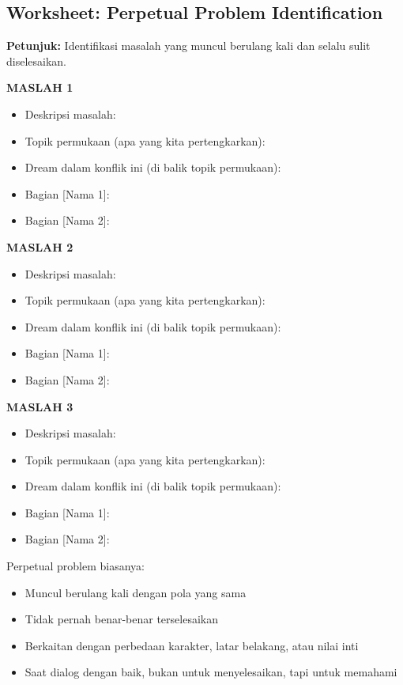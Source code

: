 \subsection{Worksheet: Perpetual Problem Identification}

\begin{exercisebox}
\textbf{Petunjuk:} Identifikasi masalah yang muncul berulang kali dan selalu sulit diselesaikan.

\vspace{0.3cm}
\textbf{MASLAH 1}
\begin{itemize}[itemsep=0.15cm]
    \item Deskripsi masalah: \hrulefill
    \item Topik permukaan (apa yang kita pertengkarkan): \hrulefill
    \item Dream dalam konflik ini (di balik topik permukaan): \hrulefill
    \item Bagian [Nama 1]: \hrulefill
    \item Bagian [Nama 2]: \hrulefill
\end{itemize}

\textbf{MASLAH 2}
\begin{itemize}[itemsep=0.15cm]
    \item Deskripsi masalah: \hrulefill
    \item Topik permukaan (apa yang kita pertengkarkan): \hrulefill
    \item Dream dalam konflik ini (di balik topik permukaan): \hrulefill
    \item Bagian [Nama 1]: \hrulefill
    \item Bagian [Nama 2]: \hrulefill
\end{itemize}

\textbf{MASLAH 3}
\begin{itemize}[itemsep=0.15cm]
    \item Deskripsi masalah: \hrulefill
    \item Topik permukaan (apa yang kita pertengkarkan): \hrulefill
    \item Dream dalam konflik ini (di balik topik permukaan): \hrulefill
    \item Bagian [Nama 1]: \hrulefill
    \item Bagian [Nama 2]: \hrulefill
\end{itemize}

\begin{tipbox}
Perpetual problem biasanya:
\begin{itemize}[itemsep=0.1cm]
    \item Muncul berulang kali dengan pola yang sama
    \item Tidak pernah benar-benar terselesaikan
    \item Berkaitan dengan perbedaan karakter, latar belakang, atau nilai inti
    \item Saat dialog dengan baik, bukan untuk menyelesaikan, tapi untuk memahami
\end{itemize}
\end{tipbox}
\end{exercisebox}

